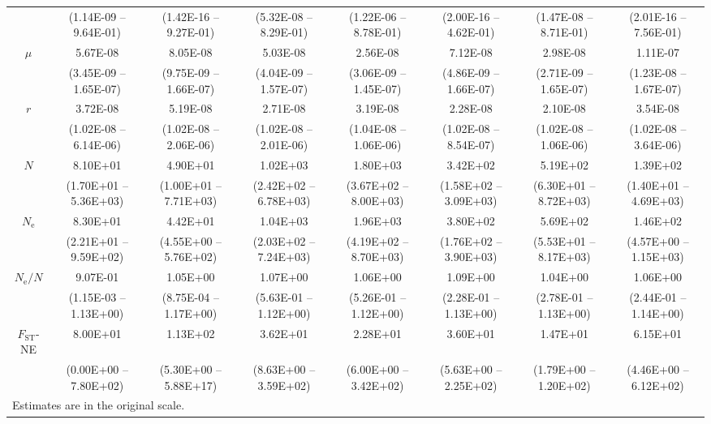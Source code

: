 \documentclass[a4paper, 12pt]{article}
\begin{document}
\begin{table}
\begin{tiny}
\begin{tabular}{cccccccc}
         & (1.14E-09 – 9.64E-01) & (1.42E-16 – 9.27E-01) & (5.32E-08 – 8.29E-01) & (1.22E-06 – 8.78E-01) & (2.00E-16 – 4.62E-01) & (1.47E-08 – 8.71E-01) & (2.01E-16 – 7.56E-01) \\
        $\mu$ & 5.67E-08 & 8.05E-08 & 5.03E-08 & 2.56E-08 & 7.12E-08 & 2.98E-08 & 1.11E-07 \\
         & (3.45E-09 – 1.65E-07) & (9.75E-09 – 1.66E-07) & (4.04E-09 – 1.57E-07) & (3.06E-09 – 1.45E-07) & (4.86E-09 – 1.66E-07) & (2.71E-09 – 1.65E-07) & (1.23E-08 – 1.67E-07) \\
        $r$ & 3.72E-08 & 5.19E-08 & 2.71E-08 & 3.19E-08 & 2.28E-08 & 2.10E-08 & 3.54E-08 \\
         & (1.02E-08 – 6.14E-06) & (1.02E-08 – 2.06E-06) & (1.02E-08 – 2.01E-06) & (1.04E-08 – 1.06E-06) & (1.02E-08 – 8.54E-07) & (1.02E-08 – 1.06E-06) & (1.02E-08 – 3.64E-06) \\
        $N$ & 8.10E+01 & 4.90E+01 & 1.02E+03 & 1.80E+03 & 3.42E+02 & 5.19E+02 & 1.39E+02 \\
         & (1.70E+01 – 5.36E+03) & (1.00E+01 – 7.71E+03) & (2.42E+02 – 6.78E+03) & (3.67E+02 – 8.00E+03) & (1.58E+02 – 3.09E+03) & (6.30E+01 – 8.72E+03) & (1.40E+01 – 4.69E+03) \\
        $N_{\mathrm{e}}$ & 8.30E+01 & 4.42E+01 & 1.04E+03 & 1.96E+03 & 3.80E+02 & 5.69E+02 & 1.46E+02 \\
         & (2.21E+01 – 9.59E+02) & (4.55E+00 – 5.76E+02) & (2.03E+02 – 7.24E+03) & (4.19E+02 – 8.70E+03) & (1.76E+02 – 3.90E+03) & (5.53E+01 – 8.17E+03) & (4.57E+00 – 1.15E+03) \\
        $N_{\mathrm{e}}/N$ & 9.07E-01 & 1.05E+00 & 1.07E+00 & 1.06E+00 & 1.09E+00 & 1.04E+00 & 1.06E+00 \\
         & (1.15E-03 – 1.13E+00) & (8.75E-04 – 1.17E+00) & (5.63E-01 – 1.12E+00) & (5.26E-01 – 1.12E+00) & (2.28E-01 – 1.13E+00) & (2.78E-01 – 1.13E+00) & (2.44E-01 – 1.14E+00) \\
         \midrule
        $F_{\mathrm{ST}}$-NE & 8.00E+01 & 1.13E+02 & 3.62E+01 & 2.28E+01 & 3.60E+01 & 1.47E+01 & 6.15E+01 \\
         & (0.00E+00 – 7.80E+02) & (5.30E+00 – 5.88E+17) & (8.63E+00 – 3.59E+02) & (6.00E+00 – 3.42E+02) & (5.63E+00 – 2.25E+02) & (1.79E+00 – 1.20E+02) & (4.46E+00 – 6.12E+02) \\
          \bottomrule
    \multicolumn{8}{l}{\tiny  Estimates are in the original scale.} \\
    \end{tabular}
\label{tab:supple_bees_posteriors}
\end{tiny}
\end{table}
\end{document}
